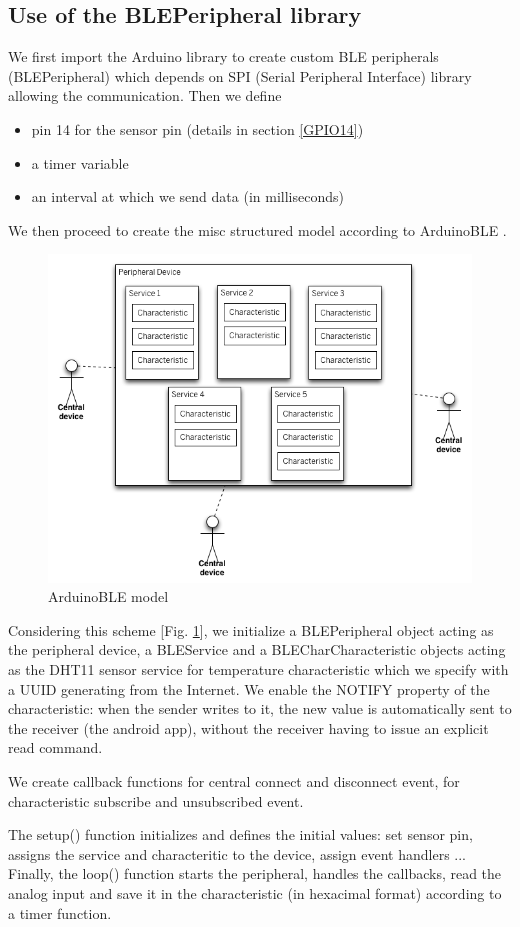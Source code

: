 \subsection{Use of the BLEPeripheral library}
We first import the Arduino library to create custom BLE peripherals (BLEPeripheral) which depends on SPI (Serial Peripheral Interface) library allowing the communication.
Then we define 
\begin{itemize}
    \item pin 14 for the sensor pin (details in section \ref{GPIO14})
    \item a timer variable
    \item an interval at which we send data (in milliseconds)
\end{itemize}
We then proceed to create the misc structured model according to ArduinoBLE \cite{b3}.
\begin{figure}[!ht]%
    \centering
    \includegraphics[scale=0.2]{images/ble-bulletin-board-model.png}%
    \caption{ArduinoBLE model}%
    \label{fig:ArduinoBLE}%
\end{figure}
Considering this scheme [Fig. \ref{fig:ArduinoBLE}], we initialize a BLEPeripheral object acting as the peripheral device, a BLEService and a BLECharCharacteristic objects acting as the DHT11 sensor service for temperature characteristic which we specify with a UUID generating from the Internet.
We enable the NOTIFY property of the characteristic: when the sender writes to it, the new value is automatically sent to the receiver (the android app), without the receiver having to issue an explicit read command.

We create callback functions for central connect and disconnect event, for characteristic subscribe and unsubscribed event.

The setup() function initializes and defines the initial values: set sensor pin, assigns the service and characteritic to the device, assign event handlers ...
Finally, the loop() function starts the peripheral, handles the callbacks, read the analog input and save it in the characteristic (in hexacimal format) according to a timer function.